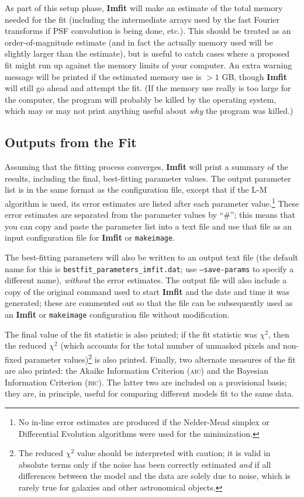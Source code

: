 \documentclass[10pt,a4paper,article]{memoir}
\newcommand{\imfit}{\textbf{Imfit}}
\newcommand{\makeimage}{\texttt{makeimage}}
\newcommand{\chisquare}{\ensuremath{\chi^{2}}}
\begin{document}
As part of this setup phase, \imfit{} will make an estimate of the total
memory needed for the fit (including the intermediate arrays used by the
fast Fourier transforms if PSF convolution is being done, etc.). This
should be treated as an order-of-magnitude estimate (and in fact the
actually memory used will be slightly larger than the estimate), but is
useful to catch cases where a proposed fit might run up against the
memory limits of your computer. An extra warning message will be printed
if the estimated memory use is $> 1$ GB, though \imfit{} will still go
ahead and attempt the fit. (If the memory use really is too large for
the computer, the program will probably be killed by the operating
system, which may or may not print anything useful about \textit{why}
the program was killed.)


\subsection{Outputs from the Fit}

Assuming that the fitting process converges, \imfit{} will print a
summary of the results, including the final, best-fitting parameter
values. The output parameter list is in the same format as the
configuration file, except that if the L-M algorithm is used, its error
estimates are listed after each parameter value.\footnote{No in-line
error estimates are produced if the Nelder-Mead simplex or Differential
Evolution algorithms were used for the minimization.} These error
estimates are separated from the parameter values by ``\#''; this means
that you can copy and paste the parameter list into a text file and use
that file as an input configuration file for \imfit{} or \makeimage. 

The best-fitting parameters will also be written to an output text file (the default
name for this is \texttt{bestfit\_parameters\_imfit.dat}; use \texttt{--save-params} to
specify a different name), \textit{without} the error estimates. The output file
will also include a copy of the original command used to start \imfit{} and the
date and time it was generated; these are commented out so that the file can be
subsequently used as an \imfit{} or \makeimage{} configuration file without
modification.

The final value of the fit statistic is also printed; if the fit
statistic was \chisquare, then  the reduced $\chi^{2}$ (which accounts
for the total number of unmasked pixels and non-fixed parameter
values)\footnote{The reduced $\chi^{2}$ value should be interpreted with
caution; it is valid in absolute terms only if the noise has been
correctly estimated \textit{and} if all differences between the model
and the data are solely due to noise, which is rarely true for galaxies
and other astronomical objects.} is also printed. Finally, two alternate
measures of the fit are also printed: the Akaike Information Criterion
(\textsc{aic}) and the Bayesian Information Criterion (\textsc{bic}).
The latter two are included on a provisional basis; they are, in
principle, useful for comparing different models fit to the same data.
\end{document}
